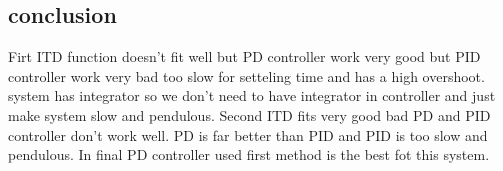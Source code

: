 \subsection{conclusion}
Firt ITD function doesn't fit well but PD controller work very good but PID controller work very bad too slow for setteling time and has a high overshoot. system has integrator so we don't need to have integrator in controller and just make system slow and pendulous.
Second ITD fits very good bad PD and PID controller don't work well.
PD is far better than PID and PID is too slow and pendulous.
In final PD controller used first method is the best fot this system.